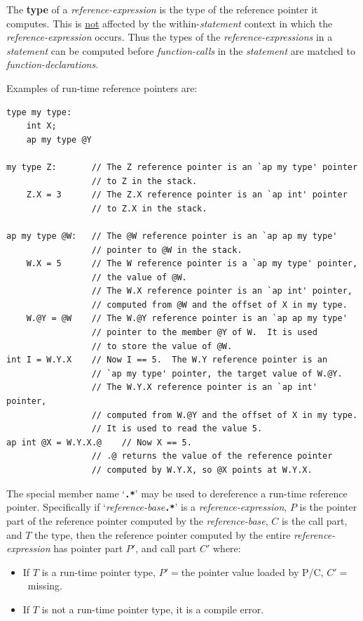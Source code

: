 \documentclass[12pt]{article}
\newcommand{\TT}[1]{{\tt \bfseries #1}}
\newcommand{\key}[1]{{\rm \bfseries #1}}
\newenvironment{indpar}[1][0.3in]%
	{\begin{list}{}%
		     {\setlength{\itemsep}{0in}%
		      \setlength{\topsep}{0in}%
		      \setlength{\parsep}{1ex}%
		      \setlength{\labelwidth}{#1}%
		      \setlength{\leftmargin}{#1}%
		      \addtolength{\leftmargin}{\labelsep}}%
	 \item}%
	{\end{list}}
\begin{document}
The \key{type} of a {\em reference-expression} is the type of the reference
pointer it computes.  This is \underline{not} affected by the
within-{\em statement} context in which the {\em reference-expression}
occurs.  Thus the types of the {\em reference-expressions} in a
{\em statement} can be computed before {\em function-calls} in the
{\em statement} are matched to {\em function-declarations}.

Examples of run-time reference pointers are:
\begin{indpar}\small\begin{verbatim}
type my type:
    int X;
    ap my type @Y

my type Z:       // The Z reference pointer is an `ap my type' pointer
                 // to Z in the stack.
    Z.X = 3      // The Z.X reference pointer is an `ap int' pointer
                 // to Z.X in the stack.

ap my type @W:   // The @W reference pointer is an `ap ap my type'
                 // pointer to @W in the stack.
    W.X = 5      // The W reference pointer is a `ap my type' pointer,
                 // the value of @W.
                 // The W.X reference pointer is an `ap int' pointer,
                 // computed from @W and the offset of X in my type.
    W.@Y = @W    // The W.@Y reference pointer is an `ap ap my type'
                 // pointer to the member @Y of W.  It is used
                 // to store the value of @W.
int I = W.Y.X    // Now I == 5.  The W.Y reference pointer is an
                 // `ap my type' pointer, the target value of W.@Y.
                 // The W.Y.X reference pointer is an `ap int' pointer,
                 // computed from W.@Y and the offset of X in my type.
                 // It is used to read the value 5.
ap int @X = W.Y.X.@    // Now X == 5.
                 // .@ returns the value of the reference pointer
                 // computed by W.Y.X, so @X points at W.Y.X.

\end{verbatim}\end{indpar}

The special member name `\TT{.*}' may be used to dereference
a run-time reference pointer.  Specifically if `{\em reference-base}\TT{.*}' is
a {\em reference-expression}, $P$ is the pointer part of the
reference pointer computed by the {\em reference-base},
$C$ is the call part, and $T$ the type,
then the reference pointer computed by
the entire {\em reference-expression} has pointer part $P'$,
and call part $C'$ where:
\begin{itemize}
\item If $T$ is a run-time pointer type,
$P'=$the pointer value loaded by P/C,
$C'=$~missing.
\item If $T$ is not a run-time pointer type,
it is a compile error.
\end{itemize}
\end{document}
